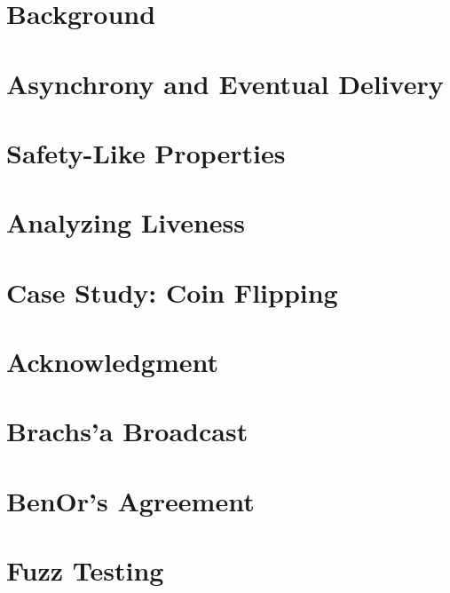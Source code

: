 \documentclass[conference]{IEEEtran}
\begin{document}
\section{Background} \label{sec:background}


\section{Asynchrony and Eventual Delivery} \label{sec:wrappers}


%

\section{Safety-Like Properties}


\section{Analyzing Liveness}


\section{Case Study: Coin Flipping}


\section{Acknowledgment}





\newpage

\appendix

\section{Brachs'a Broadcast}
%

\section{BenOr's Agreement}
%

%
\section{Fuzz Testing}


\end{document}
